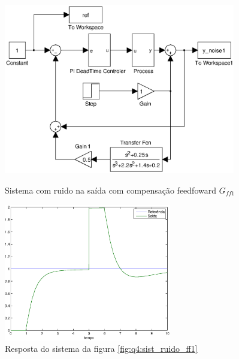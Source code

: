 \begin{figure}[htb]
\centering
\includegraphics[width=0.9\textwidth]{imgs/questao4/sist_ruido_ff1}
\caption{Sistema com ruido na saída com compensação feedfoward $G_{ff1}$}
\label{fig:q4:sist_ruido_ff1}
\includegraphics[width=0.65\textwidth]{imgs/questao4/saida_ruido_ff1}
\caption{Resposta do sistema da figura \ref{fig:q4:sist_ruido_ff1}}
\label{fig:q4:saida_ruido_ff1}
\end{figure}

